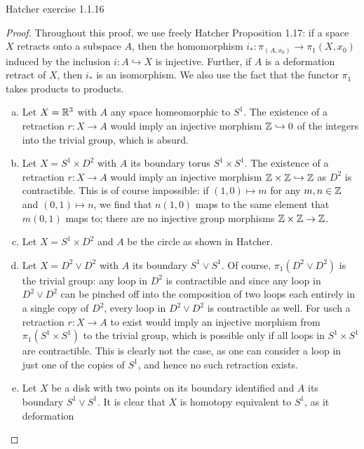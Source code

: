 \documentclass{../../mathnotes}
\begin{document}
\begin{prop}
    Hatcher exercise 1.1.16
\end{prop}
\begin{proof}
    Throughout this proof, we use freely Hatcher Proposition 1.17: if a space $X$ retracts onto
    a subspace $A$, then the homomorphism $i_*:\pi_(A,x_0)\to\pi_1(X,x_0)$ induced by the inclusion
    $i:A\hookrightarrow X$ is injective. Further, if $A$ is a deformation retract of $X$, then
    $i_*$ is an isomorphism. We also use the fact that the functor $\pi_1$ takes
    products to products.
    \begin{enumerate}[(a)]
        \item Let $X=\mathbb{R}^3$ with $A$ any space homeomorphic to $S^1$. The existence of a
            retraction $r:X\to A$ would imply an injective morphism $\mathbb{Z}\hookrightarrow 0$ of
            the integers into the trivial group, which is absurd.
        \item Let $X=S^1\times D^2$ with $A$ its boundary torus $S^1\times S^1$. The existence
            of a retraction $r:X\to A$ would imply an injective morphism
            $\mathbb{Z}\times\mathbb{Z}\hookrightarrow\mathbb{Z}$ as $D^2$ is contractible. This is of course impossible:
            if $(1,0)\mapsto m$ for any $m,n\in\mathbb{Z}$ and $(0,1)\mapsto n$, we find that
            $n(1,0)$ maps to the same element that $m(0,1)$ maps to; there are no injective group
            morphisms $\mathbb{Z}\times\mathbb{Z}\to\mathbb{Z}$.
        \item Let $X=S^1\times D^2$ and $A$ be the circle as shown in Hatcher.
        \item Let $X=D^2\vee D^2$ with $A$ its boundary $S^1\vee S^1$. Of course,
            $\pi_1(D^2\vee D^2)$ is the trivial group: any loop in $D^2$ is contractible
            and since any loop in $D^2\vee D^2$ can be pinched off into the composition
            of two loops each entirely in a single copy of $D^2$, every loop in $D^2\vee D^2$
            is contractible as well. For usch a retraction $r:X\to A$ to exist would imply
            an injective morphism from $\pi_1(S^1\times S^1)$ to the trivial group, which is
            possible only if all loops in $S^1\times S^1$ are contractible. This is clearly
            not the case, as one can consider a loop in just one of the copies of $S^1$, and
            hence no such retraction exists.
        \item Let $X$ be a disk with two points on its boundary identified and $A$ its boundary
            $S^1\vee S^1$. It is clear that $X$ is homotopy equivalent to $S^1$, as it deformation

\end{enumerate}
\end{proof}
\end{document}
